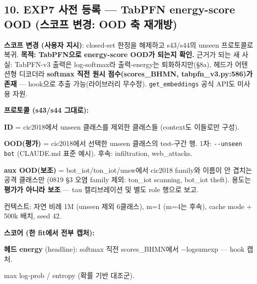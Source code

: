 \subsection{10. EXP7 사전 등록 — TabPFN energy-score OOD (스코프 변경: OOD 축 재개방)}
\textbf{스코프 변경 (사용자 지시)}: closed-set 한정을 해제하고 s43/\allowbreak{}s44의 unseen 프로토콜로 복귀. \textbf{목적: TabPFN으로 energy-score OOD가 되는지 확인.} 근거가 되는 새 사실: TabPFN-v3 출력은 log-softmax라 출력-energy는 퇴화하지만(§8a), 헤드가 어텐션형 디코더라 \textbf{softmax 직전 원시 점수(scores\_\allowbreak{}BHMN, tabpfn\_\allowbreak{}v3.py:586)가 존재} — hook으로 추출 가능(라이브러리 무수정). \texttt{get\_\allowbreak{}\allowbreak{}embe\allowbreak{}ddings} 공식 API도 미사용 자원.

\textbf{프로토콜 (s43/\allowbreak{}s44 그대로):}

\par\noindent \textbullet\enspace \textbf{ID} =\allowbreak{} cic2018에서 unseen 클래스를 제외한 클래스들 (context도 이들로만 구성).


\par\noindent \textbullet\enspace \textbf{OOD(평가)} =\allowbreak{} cic2018에서 선택한 unseen 클래스의 test-구간 행. 1차: \texttt{-\allowbreak{}-\allowbreak{}unseen\allowbreak{} bot} (CLAUDE.md 표준 예시). 후속: infiltration, web\_\allowbreak{}attacks.


\par\noindent \textbullet\enspace \textbf{aux OOD(보조)} =\allowbreak{} bot\_\allowbreak{}iot/\allowbreak{}ton\_\allowbreak{}iot/\allowbreak{}unsw에서 cic2018 family와 이름이 안 겹치는 공격 클래스만 (0819 §3 오염 family 제외: ton\_\allowbreak{}iot scanning, bot\_\allowbreak{}iot theft). 용도는 \textbf{평가가 아니라 보조} — tau 캘리브레이션 및 별도 role 행으로 보고.


\par\noindent \textbullet\enspace 컨텍스트: 자연 비례 1M (unseen 제외 6클래스), m=\allowbreak{}1 (m=\allowbreak{}4는 후속), cache mode +\allowbreak{} 500k 배치, seed 42.


\textbf{스코어 (한 fit에서 전부 캡처):}

\par\noindent \textbullet\enspace \textbf{헤드 energy} (headline): softmax 직전 scores\_\allowbreak{}BHMN에서 −logsumexp — hook 캡처.


\par\noindent \textbullet\enspace max log-prob /\allowbreak{} entropy (확률 기반 대조군).


